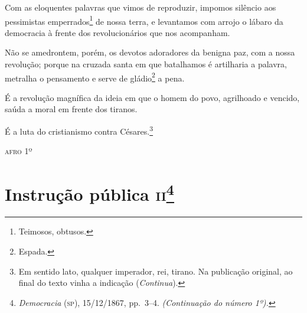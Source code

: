 Com as eloquentes palavras que vimos de reproduzir, impomos silêncio aos
pessimistas emperrados\footnote{Teimosos, obtusos.} de nossa terra, e
levantamos com arrojo o lábaro da democracia à frente dos
revolucionários que nos acompanham.

Não se amedrontem, porém, os devotos adoradores da benigna paz, com a
nossa revolução; porque na cruzada santa em que batalhamos é artilharia
a palavra, metralha o pensamento e serve de gládio\footnote{Espada.} a
pena.

É a revolução magnífica da ideia em que o homem do povo, agrilhoado e
vencido, saúda a moral em frente dos tiranos.

É a luta do cristianismo contra Césares.\footnote{Em sentido lato,
  qualquer imperador, rei, tirano. Na publicação original, ao final do texto vinha a indicação (\emph{Continua}).}



\begin{flushright}
\textsc{afro} 1º
\end{flushright}

\chapter{Instrução pública \textsc{ii}\footnote{\emph{Democracia} (\textsc{sp}),
  15/12/1867, pp.~3--4. \emph{(Continuação do número 1º).}}}

